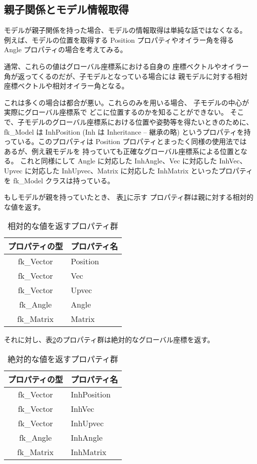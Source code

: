 \subsection{親子関係とモデル情報取得}
モデルが親子関係を持った場合、モデルの情報取得は単純な話ではなくなる。
例えば、モデルの位置を取得する Position プロパティやオイラー角を得る
Angle プロパティの場合を考えてみる。

通常、これらの値はグローバル座標系における自身の
座標ベクトルやオイラー角が返ってくるのだが、子モデルとなっている場合には
親モデルに対する相対座標ベクトルや相対オイラー角となる。

これは多くの場合は都合が悪い。これらのみを用いる場合、
子モデルの中心が実際にグローバル座標系で
どこに位置するのかを知ることができない。
そこで、子モデルのグローバル座標系における位置や姿勢等を得たいときのために、
fk\_Model は InhPosition (Inh は Inheritance -- 継承の略)
というプロパティを持っている。このプロパティは
Position プロパティとまったく同様の使用法ではあるが、例え親モデルを
持っていても正確なグローバル座標系による位置となる。
これと同様にして Angle に対応した
InhAngle、Vec に対応した InhVec、Upvec に対応した
InhUpvec、Matrix に対応した InhMatrix といったプロパティを
fk\_Model クラスは持っている。

もしモデルが親を持っていたとき、
表\ref{tbl:fkInh1}に示す
プロパティ群は親に対する相対的な値を返す。

\begin{table}[H]
\caption{相対的な値を返すプロパティ群}
\label{tbl:fkInh1}
\begin{center}
\begin{tabular}{|c|l|}
\hline
プロパティの型 & プロパティ名 \\ \hline \hline
fk\_Vector & Position \\ \hline
fk\_Vector & Vec \\ \hline
fk\_Vector & Upvec \\ \hline
fk\_Angle & Angle \\ \hline
fk\_Matrix & Matrix \\ \hline
\end{tabular}
\end{center}
\end{table}

それに対し、表\ref{tbl:fkInh2}のプロパティ群は絶対的なグローバル座標を返す。

\begin{table}[H]
\caption{絶対的な値を返すプロパティ群}
\label{tbl:fkInh2}
\begin{center}
\begin{tabular}{|c|l|}
\hline
プロパティの型 & プロパティ名 \\ \hline \hline
fk\_Vector & InhPosition \\ \hline
fk\_Vector & InhVec \\ \hline
fk\_Vector & InhUpvec \\ \hline
fk\_Angle & InhAngle \\ \hline
fk\_Matrix & InhMatrix \\ \hline
\end{tabular}
\end{center}
\end{table}

